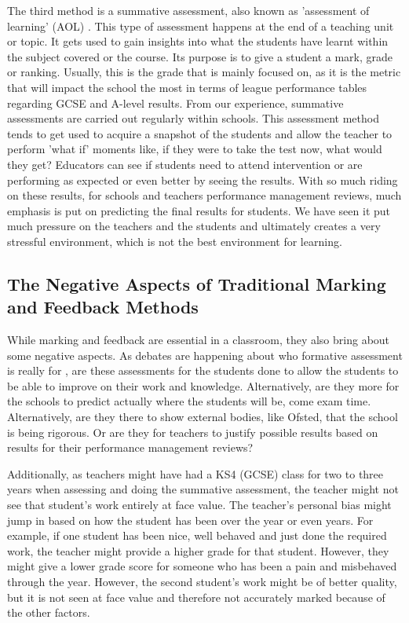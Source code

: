 		The third method is a summative assessment, also known as 'assessment of learning' (AOL) \cite{wellington2007secondary}. This type of assessment happens at the end of a teaching unit or topic. It gets used to gain insights into what the students have learnt within the subject covered or the course. Its purpose is to give a student a mark, grade or ranking. Usually, this is the grade that is mainly focused on, as it is the metric that will impact the school the most in terms of league performance tables regarding GCSE and A-level results. From our experience, summative assessments are carried out regularly within schools. This assessment method tends to get used to acquire a snapshot of the students and allow the teacher to perform 'what if' moments like, if they were to take the test now, what would they get? Educators can see if students need to attend intervention or are performing as expected or even better by seeing the results. With so much riding on these results, for schools and teachers performance management reviews, much emphasis is put on predicting the final results for students. We have seen it put much pressure on the teachers and the students and ultimately creates a very stressful environment, which is not the best environment for learning.
	
	
	\subsection{The Negative Aspects of Traditional Marking and Feedback Methods}
		
		While marking and feedback are essential in a classroom, they also bring about some negative aspects. As debates are happening about who formative assessment is really for \cite{wellington2007secondary}, are these assessments for the students done to allow the students to be able to improve on their work and knowledge. Alternatively, are they more for the schools to predict actually where the students will be, come exam time. Alternatively, are they there to show external bodies, like Ofsted, that the school is being rigorous. Or are they for teachers to justify possible results based on results for their performance management reviews?
		
		Additionally, as teachers might have had a KS4 (GCSE) class for two to three years when assessing and doing the summative assessment, the teacher might not see that student's work entirely at face value. The teacher's personal bias might jump in based on how the student has been over the year or even years. For example, if one student has been nice, well behaved and just done the required work, the teacher might provide a higher grade for that student. However, they might give a lower grade score for someone who has been a pain and misbehaved through the year. However, the second student's work might be of better quality, but it is not seen at face value and therefore not accurately marked because of the other factors.
		
